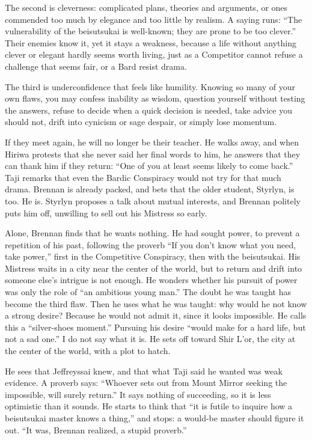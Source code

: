 The second is cleverness: complicated plans, theories and arguments, or ones commended too much by elegance and too little by realism. A saying runs: ``The vulnerability of the beisutsukai is well-known; they are prone to be too clever.'' Their enemies know it, yet it stays a weakness, because a life without anything clever or elegant hardly seems worth living, just as a Competitor cannot refuse a challenge that seems fair, or a Bard resist drama.

The third is underconfidence that feels like humility. Knowing so many of your own flaws, you may confess inability as wisdom, question yourself without testing the answers, refuse to decide when a quick decision is needed, take advice you should not, drift into cynicism or sage despair, or simply lose momentum. 

If they meet again, he will no longer be their teacher. He walks away, and when Hiriwa protests that she never said her final words to him, he answers that they can thank him if they return: ``One of you at least seems likely to come back.'' Taji remarks that even the Bardic Conspiracy would not try for that much drama. Brennan is already packed, and bets that the older student, Styrlyn, is too. He is. Styrlyn proposes a talk about mutual interests, and Brennan politely puts him off, unwilling to sell out his Mistress so early.

Alone, Brennan finds that he wants nothing. He had sought power, to prevent a repetition of his past, following the proverb ``If you don't know what you need, take power,'' first in the Competitive Conspiracy, then with the beisutsukai. His Mistress waits in a city near the center of the world, but to return and drift into someone else's intrigue is not enough. He wonders whether his pursuit of power was only the role of ``an ambitious young man.'' The doubt he was taught has become the third flaw. Then he uses what he was taught: why would he not know a strong desire? Because he would not admit it, since it looks impossible. He calls this a ``silver-shoes moment.''  Pursuing his desire ``would make for a hard life, but not a sad one.'' I do not say what it is. He sets off toward Shir L'or, the city at the center of the world, with a plot to hatch.

He sees that Jeffreyssai knew, and that what Taji said he wanted was weak evidence. A proverb says: ``Whoever sets out from Mount Mirror seeking the impossible, will surely return.'' It says nothing of succeeding, so it is less optimistic than it sounds. He starts to think that ``it is futile to inquire how a beisutsukai master knows a thing,'' and stops: a would-be master should figure it out. ``It was, Brennan realized, a stupid proverb.'' 
